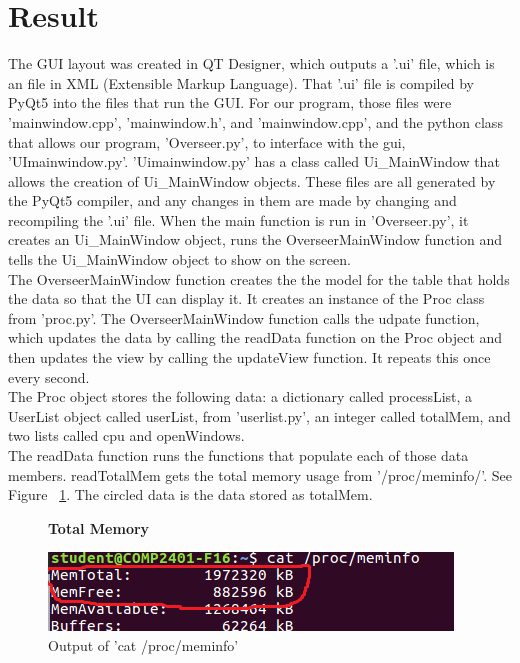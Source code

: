 \documentclass[12pt]{article}
\begin{document}
	
\section{Result}

The GUI layout was created in QT Designer, which outputs a '.ui' file, which is an file in XML (Extensible Markup Language).
That '.ui' file is compiled by PyQt5 into the files that run the GUI.
For our program, those files were 'mainwindow.cpp', 'mainwindow.h', and 'mainwindow.cpp', and the python class that allows our program, 'Overseer.py', to interface with the gui, 'UImainwindow.py'.
'Uimainwindow.py' has a class called Ui\_MainWindow that allows the creation of Ui\_MainWindow objects.
These files are all generated by the PyQt5 compiler, and any changes in them are made by changing and recompiling the '.ui' file.
When the main function is run in 'Overseer.py', it creates an Ui\_MainWindow object, runs the OverseerMainWindow function and tells the Ui\_MainWindow object to show on the screen.\\
The OverseerMainWindow function creates the the model for the table that holds the data so that the UI can display it.
It creates an instance of the Proc class from 'proc.py'.
The OverseerMainWindow function calls the udpate function, which updates the data by calling the readData function on the Proc object and then updates the view by calling the updateView function.
It repeats this once every second.\\
The Proc object stores the following data: a dictionary called processList, a UserList object called userList, from 'userlist.py', an integer called totalMem, and two lists called cpu and openWindows.\\
The readData function runs the functions that populate each of those data members.
readTotalMem gets the total memory usage from '/proc/meminfo/'.
See Figure ~\ref{figTotalMem}.
The circled data is the data stored as totalMem.
\begin{figure}[h]
	\centering
	\textbf{Total Memory}\par\medskip
	\includegraphics{totalMem}
	\caption{Output of 'cat /proc/meminfo'}
	\label{figTotalMem}
\end{figure}
\end{document}
